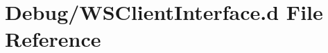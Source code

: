 \hypertarget{Debug_2WSClientInterface_8d}{}\section{Debug/\+W\+S\+Client\+Interface.d File Reference}
\label{Debug_2WSClientInterface_8d}
